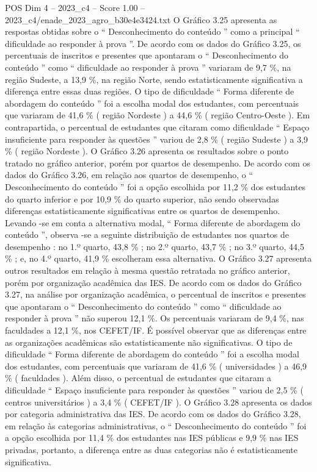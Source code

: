 \begin{textsample}{POS Dim 4 – 2023\_c4 – Score 1.00 – 2023\_c4/enade\_2023\_agro\_b30e4e3424.txt}
O Gráfico 3.25 apresenta as respostas obtidas sobre o “ Desconhecimento do conteúdo ” como a principal “ dificuldade ao responder à prova ”.
De acordo com os dados do Gráfico 3.25, os percentuais de inscritos e presentes que apontaram o “ Desconhecimento do conteúdo ” como “ dificuldade ao responder à prova ” variaram de 9,7 \%, na região Sudeste, a 13,9 \%, na região Norte, sendo estatisticamente significativa a diferença entre essas duas regiões.
O tipo de dificuldade “ Forma diferente de abordagem do conteúdo ” foi a escolha modal dos estudantes, com percentuais que variaram de 41,6 \% ( região Nordeste ) a 44,6 \% ( região Centro-Oeste ).
Em contrapartida, o percentual de estudantes que citaram como dificuldade “ Espaço insuficiente para responder às questões ” variou de 2,8 \% ( região Sudeste ) a 3,9 \% ( região Nordeste ).
O Gráfico 3.26 apresenta os resultados sobre o ponto tratado no gráfico anterior, porém por quartos de desempenho.
De acordo com os dados do Gráfico 3.26, em relação aos quartos de desempenho, o “ Desconhecimento do conteúdo ” foi a opção escolhida por 11,2 \% dos estudantes do quarto inferior e por 10,9 \% do quarto superior, não sendo observadas diferenças estatisticamente significativas entre os quartos de desempenho.
Levando -se em conta a alternativa modal, “ Forma diferente de abordagem do conteúdo ”, observa -se a seguinte distribuição de estudantes nos quartos de desempenho : no 1.º quarto, 43,8 \% ; no 2.º quarto, 43,7 \% ; no 3.º quarto, 44,5 \% ; e, no 4.º quarto, 41,9 \% escolheram essa alternativa.
O Gráfico 3.27 apresenta outros resultados em relação à mesma questão retratada no gráfico anterior, porém por organização acadêmica das IES.
De acordo com os dados do Gráfico 3.27, na análise por organização acadêmica, o percentual de inscritos e presentes que apontaram o “ Desconhecimento do conteúdo ” como “ dificuldade ao responder à prova ” não superou 12,1 \%.
Os percentuais variaram de 9,4 \%, nas faculdades a 12,1 \%, nos CEFET/IF.
É possível observar que as diferenças entre as organizações acadêmicas são estatisticamente não significativas.
O tipo de dificuldade “ Forma diferente de abordagem do conteúdo ” foi a escolha modal dos estudantes, com percentuais que variaram de 41,6 \% ( universidades ) a 46,9 \% ( faculdades ).
Além disso, o percentual de estudantes que citaram a dificuldade “ Espaço insuficiente para responder às questões ” variou de 2,5 \% ( centros universitários ) a 3,4 \% ( CEFET/IF ).
O Gráfico 3.28 apresenta os dados por categoria administrativa das IES.
De acordo com os dados do Gráfico 3.28, em relação às categorias administrativas, o “ Desconhecimento do conteúdo ” foi a opção escolhida por 11,4 \% dos estudantes nas IES públicas e 9,9 \% nas IES privadas, portanto, a diferença entre as duas categorias não é estatisticamente significativa.

\end{textsample}
